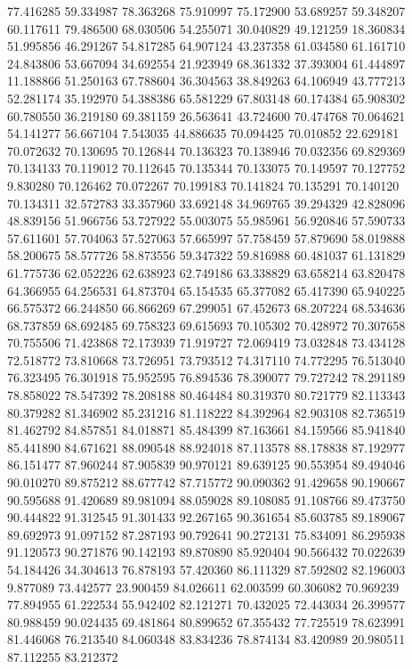 77.416285
59.334987
78.363268
75.910997
75.172900
53.689257
59.348207
60.117611
79.486500
68.030506
54.255071
30.040829
49.121259
18.360834
51.995856
46.291267
54.817285
64.907124
43.237358
61.034580
61.161710
24.843806
53.667094
34.692554
21.923949
68.361332
37.393004
61.444897
11.188866
51.250163
67.788604
36.304563
38.849263
64.106949
43.777213
52.281174
35.192970
54.388386
65.581229
67.803148
60.174384
65.908302
60.780550
36.219180
69.381159
26.563641
43.724600
70.474768
70.064621
54.141277
56.667104
7.543035
44.886635
70.094425
70.010852
22.629181
70.072632
70.130695
70.126844
70.136323
70.138946
70.032356
69.829369
70.134133
70.119012
70.112645
70.135344
70.133075
70.149597
70.127752
9.830280
70.126462
70.072267
70.199183
70.141824
70.135291
70.140120
70.134311
32.572783
33.357960
33.692148
34.969765
39.294329
42.828096
48.839156
51.966756
53.727922
55.003075
55.985961
56.920846
57.590733
57.611601
57.704063
57.527063
57.665997
57.758459
57.879690
58.019888
58.200675
58.577726
58.873556
59.347322
59.816988
60.481037
61.131829
61.775736
62.052226
62.638923
62.749186
63.338829
63.658214
63.820478
64.366955
64.256531
64.873704
65.154535
65.377082
65.417390
65.940225
66.575372
66.244850
66.866269
67.299051
67.452673
68.207224
68.534636
68.737859
68.692485
69.758323
69.615693
70.105302
70.428972
70.307658
70.755506
71.423868
72.173939
71.919727
72.069419
73.032848
73.434128
72.518772
73.810668
73.726951
73.793512
74.317110
74.772295
76.513040
76.323495
76.301918
75.952595
76.894536
78.390077
79.727242
78.291189
78.858022
78.547392
78.208188
80.464484
80.319370
80.721779
82.113343
80.379282
81.346902
85.231216
81.118222
84.392964
82.903108
82.736519
81.462792
84.857851
84.018871
85.484399
87.163661
84.159566
85.941840
85.441890
84.671621
88.090548
88.924018
87.113578
88.178838
87.192977
86.151477
87.960244
87.905839
90.970121
89.639125
90.553954
89.494046
90.010270
89.875212
88.677742
87.715772
90.090362
91.429658
90.190667
90.595688
91.420689
89.981094
88.059028
89.108085
91.108766
89.473750
90.444822
91.312545
91.301433
92.267165
90.361654
85.603785
89.189067
89.692973
91.097152
87.287193
90.792641
90.272131
75.834091
86.295938
91.120573
90.271876
90.142193
89.870890
85.920404
90.566432
70.022639
54.184426
34.304613
76.878193
57.420360
86.111329
87.592802
82.196003
9.877089
73.442577
23.900459
84.026611
62.003599
60.306082
70.969239
77.894955
61.222534
55.942402
82.121271
70.432025
72.443034
26.399577
80.988459
90.024435
69.481864
80.899652
67.355432
77.725519
78.623991
81.446068
76.213540
84.060348
83.834236
78.874134
83.420989
20.980511
87.112255
83.212372
